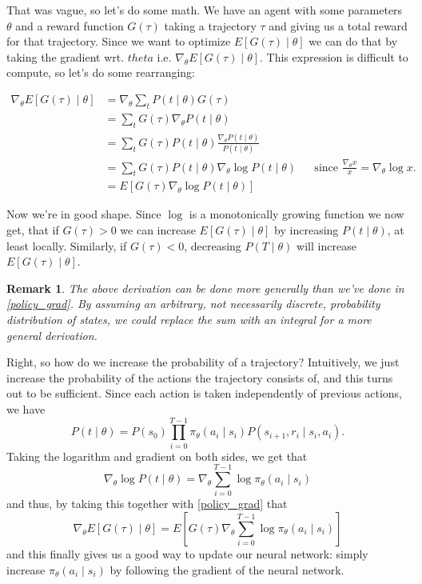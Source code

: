 \documentclass{article}
\theoremstyle{changedot}
\theoremstyle{changedotbreak}
\theoremstyle{nonumberplain}
\newtheorem{remark}{Remark}
\begin{document}
That was vague, so let's do some math. We have an agent with some parameters $\theta$ and a reward function $G(\tau)$ taking a trajectory $\tau$ and giving us a total reward for that trajectory. Since we want to optimize $E[G(\tau) \mid \theta]$ we can do that by taking the gradient wrt. $theta$ i.e. $\nabla_{\theta} E[G(\tau) \mid \theta]$. This expression is difficult to compute, so let's do some rearranging:

\begin{equation} \label{policy_grad}
\begin{aligned}
  \nabla_{\theta} E[G(\tau) \mid \theta] &= \nabla_{\theta} \sum_{t}P(t \mid \theta) G(\tau) \\
                                      &= \sum_{t} G(\tau) \nabla_{\theta} P(t \mid \theta)  \\
                                      &= \sum_{t} G(\tau) P(t \mid \theta) \frac{\nabla_{\theta} P(t \mid \theta)}{P(t \mid \theta)} \\
                                      &= \sum_{t} G(\tau) P(t \mid \theta) \nabla_{\theta} \log P(t \mid \theta) && \text{since $\frac{\nabla_{\theta} x}{x} = \nabla_{\theta} \log x$.} \\
                                      &= E[G(\tau) \nabla_{\theta} \log P(t \mid \theta)]
\end{aligned}
\end{equation}

Now we're in good shape. Since $\log$ is a monotonically growing function we now get, that if $G(\tau) > 0$ we can increase $E[G(\tau) \mid \theta]$ by increasing $P(t \mid \theta)$, at least locally. Similarly, if $G(\tau) < 0$, decreasing $P(T \mid \theta)$ will increase $E[G(\tau) \mid \theta]$.

\begin{remark}
  The above derivation can be done more generally than we've done in \ref{policy_grad}. By assuming an arbitrary, not necessarily discrete, probability distribution of states, we could replace the sum with an integral for a more general derivation.
\end{remark}

Right, so how do we increase the probability of a trajectory? Intuitively, we just increase the probability of the actions the trajectory consists of, and this turns out to be sufficient. Since each action is taken independently of previous actions, we have \[P(t \mid \theta) = P(s_{0}) \prod_{i=0}^{T-1} \pi_{\theta}(a_{i} \mid s_{i}) P(s_{i+1}, r_{i} \mid s_{i}, a_{i}).\] Taking the logarithm and gradient on both sides, we get that \[\nabla_{\theta} \log P(t \mid \theta) = \nabla_{\theta} \sum_{i=0}^{T-1} \log \pi_{\theta}(a_{i} \mid s_{i})\] and thus, by taking this together with \ref{policy_grad} that \[\nabla_{\theta} E[G(\tau) \mid \theta] = E\left[ G(\tau) \nabla_{\theta} \sum_{i=0}^{T-1} \log \pi_{\theta} (a_{i} \mid s_{i}) \right]\] and this finally gives us a good way to update our neural network: simply increase $\pi_{\theta} (a_{i} \mid s_{i})$ by following the gradient of the neural network.
\end{document}
